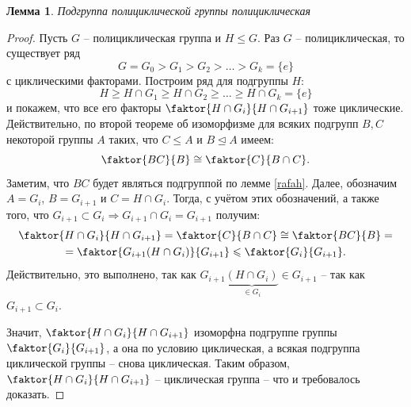 \documentclass{article}
\newtheorem{lemma}{Лемма}[section]
\begin{document}
\begin{lemma}
    Подгруппа полициклической группы полициклическая
\end{lemma}
\begin{proof}
    Пусть $G$ -- полициклическая группа и $H \leqslant G$. Раз $G$ -- полициклическая, то существует ряд
    \[
        G = G_0 > G_1 > G_2 > \ldots > G_k = \{ e\}
    \]
    с циклическими факторами.
    Построим ряд для подгруппы $H$:
    \[
        H \geqslant H \cap G_1 \geqslant H \cap G_2 \geqslant \ldots \geqslant H \cap G_k = \{ e \}
    \]
    и покажем, что все его факторы $ \faktor{H \cap G_i}{H \cap G_{i + 1}} $ тоже циклические. Действительно, по второй теореме об изоморфизме для всяких подгрупп $B, C$ некоторой группы $A$ таких, что $C \leqslant A$ и $B \trianglelefteq A$ имеем:
    \[
        \faktor{BC}{B} \cong \faktor{C}{B \cap C}.
    \]
    Заметим, что $BC$ будет являться подгруппой по лемме \ref{rafah}. Далее, обозначим $A = G_i$, $B = G_{i + 1}$ и $C = H \cap G_i$. Тогда, с учётом этих обозначений, а также того, что $G_{i + 1} \subset G_i \Rightarrow G_{i + 1} \cap G_i = G_{i + 1}$ получим:
    \begin{gather*}
        \faktor{H \cap G_i}{H \cap G_{i + 1}} = \faktor{C}{B \cap C} \cong \faktor{BC}{B} = \\
         = \faktor{G_{i + 1}(H \cap G_i)}{G_{i + 1}} \leqslant \faktor{G_i}{G_{i + 1}}.
    \end{gather*}
    Действительно, это выполнено, так как $ G_{i + 1}\underbrace{(H \cap G_i)}_{\in G_i} \in G_{i + 1} $ -- так как $G_{i + 1} \subset G_i$.

    Значит, $ \faktor{H \cap G_i}{H \cap G_{i + 1}} $ изоморфна подгруппе группы $\faktor{G_i}{G_{i + 1}}$, а она по условию циклическая, а всякая подгруппа циклической группы -- снова циклическая.
    Таким образом, $ \faktor{H \cap G_i}{H \cap G_{i + 1}} $ -- циклическая группа -- что и требовалось доказать.
\end{proof}
\end{document}
